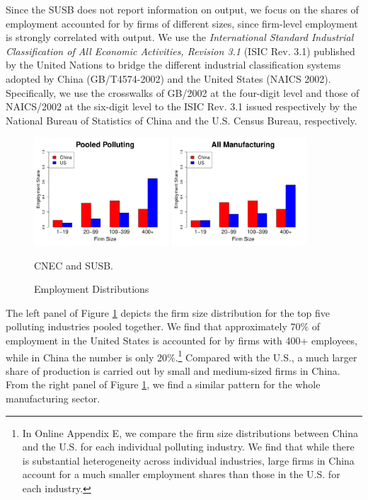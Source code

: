\documentclass[AEJ]{AEA}
\begin{document}
Since the SUSB does not report information on output, we focus on the shares of employment accounted for by firms of different sizes, since firm-level employment is strongly correlated with output. We use the \textit{International Standard Industrial Classification of All Economic Activities, Revision 3.1} (ISIC Rev. 3.1) published by the United Nations to bridge the different industrial classification systems adopted by China (GB/T4574-2002) and the United States (NAICS 2002). Specifically, we use the crosswalks of GB/2002 at the four-digit level and those of NAICS/2002 at the six-digit level to the ISIC Rev. 3.1 issued respectively by the National Bureau of Statistics of China and the U.S. Census Bureau, respectively.
\begin{figure}[t]
    \begin{center}
    \includegraphics[width=0.45\textwidth]{./Figures/poolES_R_1.pdf}
    \includegraphics[width=0.45\textwidth]{./Figures/allES_R_1.pdf}
    \caption{Employment Distributions}
    \begin{figurenotes}[Sources]
        CNEC and SUSB.
    \end{figurenotes}
    \label{fig:es}
    \end{center}
\end{figure}

The left panel of Figure \ref{fig:es} depicts the firm size distribution for the top five polluting industries pooled together. We find that approximately 70\% of employment in the United States is accounted for by firms with 400+ employees, while in China the number is only 20\%.\footnote{In Online Appendix E, we compare the firm size distributions between China and the U.S. for each individual polluting industry. We find that while there is substantial heterogeneity across individual industries, large firms in China account for a much smaller employment shares than those in the U.S. for each industry.}
Compared with the U.S., a much larger share of production is carried out by small and medium-sized firms in China. From the right panel of Figure \ref{fig:es}, we find a similar pattern for the whole manufacturing sector.
\end{document}
